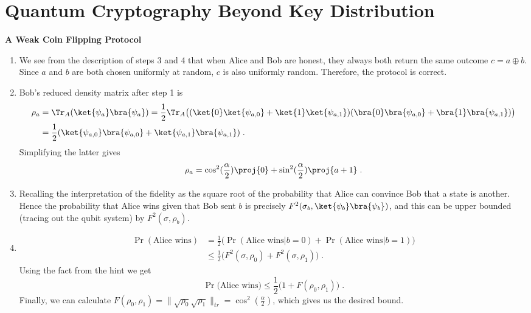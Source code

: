 
\chapter{Quantum Cryptography Beyond Key Distribution}

\begin{exercises}


\item {\bf A Weak Coin Flipping Protocol}
\begin{enumerate}
\item We see from the description of steps 3 and 4 that when Alice and Bob are honest, they always both return the same outcome $c=a\oplus b$. Since $a$ and $b$ are both chosen uniformly at random, $c$ is also uniformly random. Therefore, the protocol is correct. 

\item Bob's reduced density matrix after step 1 is 
\begin{align*}
\rho_a &= \Tr_A(\ket{\psi_{a}}\bra{\psi_a}) = \frac12 \Tr_A \big((\ket{0} \ket{\psi_{a,0}} + \ket{1} \ket{\psi_{a,1}} )(\bra{0}\bra{\psi_{a,0}}+\bra{1}\bra{\psi_{a,1}})\big) \\
&= \frac12 (\ket{\psi_{a,0}}\bra{\psi_{a,0}} + \ket{\psi_{a,1}}\bra{\psi_{a,1}})\;.
\end{align*}
Simplifying the latter gives
\begin{equation*}
\rho_a = \cos^2(\frac{\alpha}{2}) \proj{0}  +\sin^2(\frac{\alpha}{2}) \proj{a+1}\;.
\end{equation*}

\item Recalling the interpretation of the fidelity as the square root of the probability that Alice can convince Bob that a state is another. Hence the probability that Alice wins given that Bob sent $b$ is precisely $F^2(\sigma_b, \ket{\psi_b}\bra{\psi_b})$, and this can be upper bounded (tracing out the qubit system) by $F^2(\sigma, \rho_b)$.

\item
\begin{align*}
	\Pr(\mbox{Alice wins}) &= \frac12 \big(\Pr(\mbox{Alice wins} | b = 0)+ \Pr(\mbox{Alice wins} | b = 1) \big) \\
	&\leq \frac12 \big(F^2(\sigma, \rho_0)+F^2(\sigma, \rho_1)\big)\;.
\end{align*}
Using the fact from the hint we get
\begin{equation*}
\Pr\big(\mbox{Alice wins}\big) \leq \frac12\big(1+F(\rho_0, \rho_1)\big)\;.
\end{equation*}
Finally, we can calculate $F(\rho_0, \rho_1) = \|\sqrt{\rho_0}\sqrt{\rho_1} \|_{tr} = \cos^2(\frac{\alpha}{2})$, which gives us the desired bound.


\end{enumerate}
\end{exercises}
